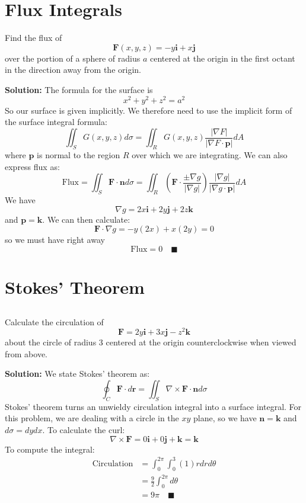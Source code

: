 \documentclass[letterpaper, 11pt]{article}
\begin{document}
\section{Flux Integrals}
Find the flux of
\[ \mathbf{F}(x,y,z) =  -y \bm{i} + x \bm{j} \]
over the portion of a sphere of radius $a$ centered at the origin in the first octant in the direction away from the origin.
\par \textbf{Solution:} The formula for the surface is
\[ x^2 + y^2 + z^2 = a^2 \]
So our surface is given implicitly. We therefore need to use the implicit form of the surface integral formula:
\[ \iint_S G(x,y,z) d\sigma = \iint_R G(x,y,z) \frac{ |\nabla F|}{|\nabla F \cdot \bm{p}|} dA \]
where $\bm{p}$ is normal to the region $R$ over which we are integrating. We can also express flux as:
\[ \text{Flux} = \iint_S \bm{F}\cdot \bm{n} d \sigma = \iint_R \left( \bm{F} \cdot \frac{ \pm \nabla g}{|\nabla g|} \right) \frac{ |\nabla g|}{|\nabla g \cdot \bm{p}|} dA \]
We have
\[ \nabla g = 2x \bm{i} + 2 y \bm{j} + 2z \bm{k} \]
and $\bm{p} = \bm{k}$. We can then calculate:
\[ \bm{F} \cdot \nabla g = -y(2x) + x (2y) = 0 \]
so we must have right away
\[ \text{Flux} = 0 \quad\blacksquare \]

\section{Stokes' Theorem}
\subsection{} Calculate the circulation of 
\[ \bm{F} = 2 y \bm{i} + 3x \bm{j} - z^2 \bm{k} \]
about the circle of radius 3 centered at the origin counterclockwise when viewed from above. 
\par \textbf{Solution:} We state Stokes' theorem as:
\[ \oint_C \bm{F} \cdot d \bm{r} = \iint_S \nabla \times \bm{F} \cdot \bm{n} d\sigma \]
Stokes' theorem turns an unwieldy circulation integral into a surface integral. For this problem, we are dealing with a circle in the $xy$ plane, so we have $\bm{n} = \bm{k}$ and $d \sigma = dydx$. To calculate the curl:
\[ \nabla \times \bm{F} = 0 \bm{i} + 0 \bm{j} + \bm{k}  = \bm{k} \]
To compute the integral:
\begin{align*} 
\text{Circulation} &= \int_0^{2 \pi} \int_0^3 (1) r dr d \theta  \\
&= \frac{9}{2} \int_0^{2\pi} d\theta \\
&= 9 \pi \quad\blacksquare 
\end{align*}
\end{document}
